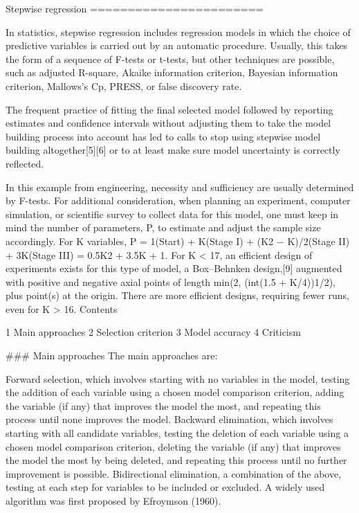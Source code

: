 Stepwise regression
=======================

In statistics, stepwise regression includes regression models in which the choice of predictive variables is carried out by an automatic procedure. Usually, this takes the form of a sequence of F-tests or t-tests, but other techniques are possible, such as adjusted R-square, Akaike information criterion, Bayesian information criterion, Mallows's Cp, PRESS, or false discovery rate.

The frequent practice of fitting the final selected model followed by reporting estimates and confidence intervals without adjusting them to take the model building process into account has led to calls to stop using stepwise model building altogether[5][6] or to at least make sure model uncertainty is correctly reflected.


In this example from engineering, necessity and sufficiency are usually determined by F-tests. For additional consideration, when planning an experiment, computer simulation, or scientific survey to collect data for this model, one must keep in mind the number of parameters, P, to estimate and adjust the sample size accordingly. For K variables, P = 1(Start) + K(Stage I) + (K2 − K)/2(Stage II) + 3K(Stage III) = 0.5K2 + 3.5K + 1. For K < 17, an efficient design of experiments exists for this type of model, a Box–Behnken design,[9] augmented with positive and negative axial points of length min(2, (int(1.5 + K/4))1/2), plus point(s) at the origin. There are more efficient designs, requiring fewer runs, even for K > 16.
Contents  

1 Main approaches
2 Selection criterion
3 Model accuracy
4 Criticism



### Main approaches
The main approaches are:

Forward selection, which involves starting with no variables in the model, testing the addition of each variable using a chosen model comparison criterion, adding the variable (if any) that improves the model the most, and repeating this process until none improves the model.
Backward elimination, which involves starting with all candidate variables, testing the deletion of each variable using a chosen model comparison criterion, deleting the variable (if any) that improves the model the most by being deleted, and repeating this process until no further improvement is possible.
Bidirectional elimination, a combination of the above, testing at each step for variables to be included or excluded.
A widely used algorithm was first proposed by Efroymson (1960).

